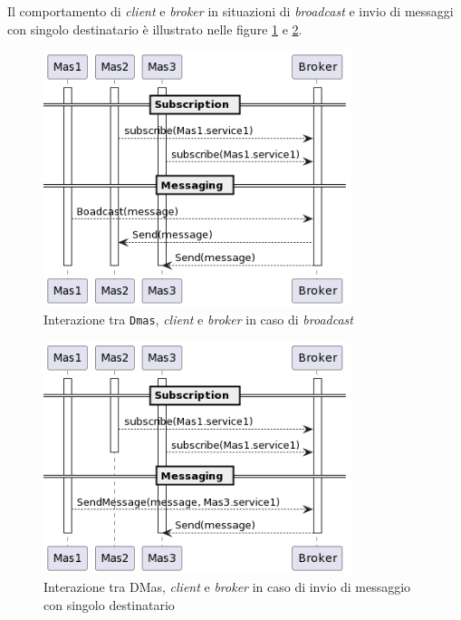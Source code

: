 Il comportamento di \textit{client} e \textit{broker} in situazioni di \textit{broadcast} e invio di messaggi con singolo destinatario è illustrato nelle figure \ref{fig:interaction-broadcast} e \ref{fig:interaction-sendmessage}.

\begin{figure}[ht!]
    \centering
    \includegraphics[width=0.8\textwidth]{figures/interaction-broadcast.png}
    \caption{Interazione tra \texttt{Dmas}, \textit{client} e \textit{broker} in caso di \textit{broadcast}}
    \label{fig:interaction-broadcast}
\end{figure}

\begin{figure}[ht!]
    \centering
    \includegraphics[width=0.8\textwidth]{figures/interaction-sendmessage.png}
    \caption{Interazione tra DMas, \textit{client} e \textit{broker} in caso di invio di messaggio con singolo destinatario}
    \label{fig:interaction-sendmessage}
\end{figure}

